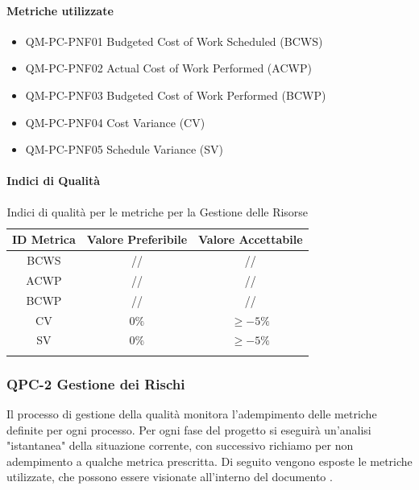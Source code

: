 		\paragraph{Metriche utilizzate}

			\begin{itemize}
				\item QM-PC-PNF01 Budgeted Cost of Work Scheduled (BCWS)
				\item QM-PC-PNF02 Actual Cost of Work Performed (ACWP)
				\item QM-PC-PNF03 Budgeted Cost of Work Performed (BCWP)
				\item QM-PC-PNF04 Cost Variance (CV)
				\item QM-PC-PNF05 Schedule Variance (SV)
			\end{itemize}

		\paragraph{Indici di Qualità}

			\begin{center}
				\begin{longtable}{|c|c|c|}
				\hline
				\rowcolor{lighter-grayer}
				\textbf{ID Metrica} & \textbf{Valore Preferibile} & \textbf{Valore Accettabile}\\
				\hline
				\endfirsthead
				\hline
				BCWS & // & // \\
				\hline
				ACWP & // & // \\
				\hline
				BCWP & // & // \\
				\hline
				CV & \(0\%\) & \(\ge -5\%\) \\
				\hline
				SV & \(0\%\) & \(\ge -5\%\) \\
				\hline
				\caption{Indici di qualità per le metriche per la Gestione delle Risorse}
				\end{longtable}
			\end{center}

	\subsubsection{QPC-2 Gestione dei Rischi}

		Il processo di gestione della qualità monitora l'adempimento delle metriche definite per ogni processo.
		Per ogni fase del progetto si eseguirà un'analisi "istantanea" della situazione corrente, con successivo richiamo per non adempimento a qualche metrica prescritta.
		Di seguito vengono esposte le metriche utilizzate, che possono essere visionate all'interno del documento .

